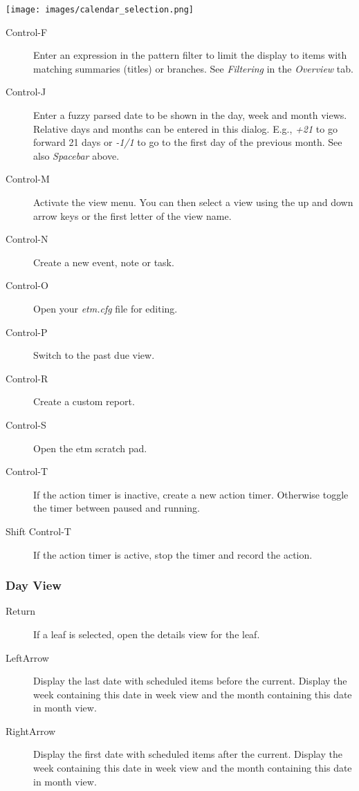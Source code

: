\documentclass[]{article}
\makeatletter
\def\maxwidth{\ifdim\Gin@nat@width>\linewidth\linewidth
\else\Gin@nat@width\fi}
\let\Oldincludegraphics\includegraphics
\renewcommand{\includegraphics}[1]{\Oldincludegraphics[width=\maxwidth]{#1}}
\makeatother
\begin{document}
\texttt{[image: images/calendar\_selection.png]}
\begin{description}
\item[Control-F]
Enter an expression in the pattern filter to limit the display to items
with matching summaries (titles) or branches. See \emph{Filtering} in
the \emph{Overview} tab.
\item[Control-J]
Enter a fuzzy parsed date to be shown in the day, week and month views.
Relative days and months can be entered in this dialog. E.g., \emph{+21}
to go forward 21 days or \emph{-1/1} to go to the first day of the
previous month. See also \emph{Spacebar} above.
\item[Control-M]
Activate the view menu. You can then select a view using the up and down
arrow keys or the first letter of the view name.
\item[Control-N]
Create a new event, note or task.
\item[Control-O]
Open your \emph{etm.cfg} file for editing.
\item[Control-P]
Switch to the past due view.
\item[Control-R]
Create a custom report.
\item[Control-S]
Open the etm scratch pad.
\item[Control-T]
If the action timer is inactive, create a new action timer. Otherwise
toggle the timer between paused and running.
\item[Shift Control-T]
If the action timer is active, stop the timer and record the action.
\end{description}

\subsubsection{Day View}

\begin{description}
\item[Return]
If a leaf is selected, open the details view for the leaf.
\item[LeftArrow]
Display the last date with scheduled items before the current. Display
the week containing this date in week view and the month containing this
date in month view.
\item[RightArrow]
Display the first date with scheduled items after the current. Display
the week containing this date in week view and the month containing this
date in month view.
\end{description}
\end{document}
